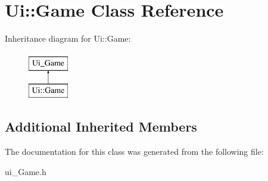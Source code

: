 \hypertarget{class_ui_1_1_game}{\section{Ui\-:\-:Game Class Reference}
\label{class_ui_1_1_game}
}
Inheritance diagram for Ui\-:\-:Game\-:\begin{figure}[H]
\begin{center}
\leavevmode
\includegraphics[height=2.000000cm]{class_ui_1_1_game}
\end{center}
\end{figure}
\subsection*{Additional Inherited Members}


The documentation for this class was generated from the following file\-:\begin{DoxyCompactItemize}
\item 
ui\-\_\-\-Game.\-h\end{DoxyCompactItemize}

